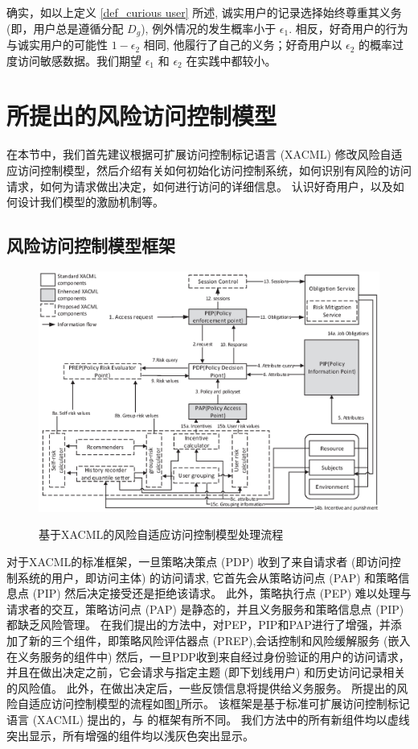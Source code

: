 确实，如以上定义 \ref{def_curious user} 所述, 诚实用户的记录选择始终尊重其义务 (即，用户总是遵循分配 $D_g$), 例外情况的发生概率小于 $\epsilon_1$. 相反，好奇用户的行为与诚实用户的可能性 $1-\epsilon_2$ 相同, 他履行了自己的义务；好奇用户以 $\epsilon_2$ 的概率过度访问敏感数据。我们期望 $\epsilon_1$ 和 $\epsilon_2$ 在实践中都较小。

\section{所提出的风险访问控制模型}
\label{sec:proposed model}
在本节中，我们首先建议根据可扩展访问控制标记语言 (XACML) \cite{verma2004xml} 修改风险自适应访问控制模型，然后介绍有关如何初始化访问控制系统，如何识别有风险的访问请求，如何为请求做出决定，如何进行访问的详细信息。 认识好奇用户，以及如何设计我们模型的激励机制等。

\subsection{风险访问控制模型框架}
\label{subsec:framework}
\begin{figure}
	\includegraphics[width=\linewidth]{./figures/Process_flow.eps}
	\label{fig:Process_flow}
	\caption{基于XACML的风险自适应访问控制模型处理流程}
\end{figure}

对于XACML的标准框架，一旦策略决策点 (PDP) 收到了来自请求者 (即访问控制系统的用户，即访问主体) 的访问请求, 它首先会从策略访问点 (PAP) 和策略信息点 (PIP) 然后决定接受还是拒绝该请求。 此外，策略执行点 (PEP) 难以处理与请求者的交互，策略访问点 (PAP) 是静态的，并且义务服务和策略信息点 (PIP) 都缺乏风险管理。
在我们提出的方法中，对PEP，PIP和PAP进行了增强，并添加了新的三个组件，即策略风险评估器点 (PREP),会话控制和风险缓解服务 (嵌入在义务服务的组件中) 然后，一旦PDP收到来自经过身份验证的用户的访问请求，并且在做出决定之前，它会请求与指定主题 (即下划线用户) 和历史访问记录相关的风险值。 此外，在做出决定后，一些反馈信息将提供给义务服务。 所提出的风险自适应访问控制模型的流程如图\ref{fig:Process_flow}所示。 该框架是基于标准可扩展访问控制标记语言 (XACML) 提出的，与 \cite{shaikh2012dynamic}的框架有所不同。 我们方法中的所有新组件均以虚线突出显示，所有增强的组件均以浅灰色突出显示。

